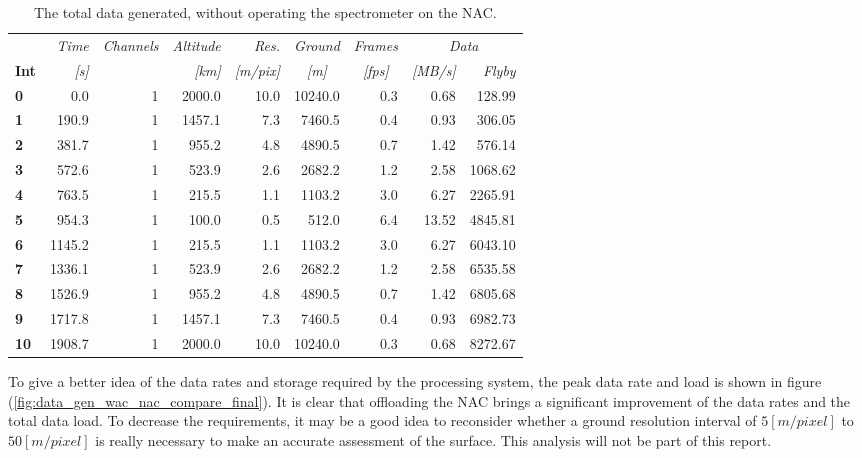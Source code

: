 \begin{table}[htb]
  \centering
    \begin{tabular}{l|r|r|r|r|r|r|r|r}
      & \textit{Time} & \textit{Channels} & \textit{Altitude} & \textit{Res.} & \textit{Ground} & \textit{Frames } & \multicolumn{2}{c}{\textit{Data}} \\
\textbf{Int} & \textit{[s]} & \textit{} & \textit{[km]} & \textit{[m/pix]} & \multicolumn{1}{c|}{\textit{[m]}} & \multicolumn{1}{c|}{\textit{[fps]}} & \textit{[MB/s]} & \textit{Flyby} \bigstrut[b]\\
\hline
\textbf{0} & 0.0   & 1     & 2000.0 & 10.0  & 10240.0 & 0.3   & 0.68  & 128.99 \bigstrut[t]\\
\textbf{1} & 190.9 & 1     & 1457.1 & 7.3   & 7460.5 & 0.4   & 0.93  & 306.05 \\
\textbf{2} & 381.7 & 1     & 955.2 & 4.8   & 4890.5 & 0.7   & 1.42  & 576.14 \\
\textbf{3} & 572.6 & 1     & 523.9 & 2.6   & 2682.2 & 1.2   & 2.58  & 1068.62 \\
\textbf{4} & 763.5 & 1     & 215.5 & 1.1   & 1103.2 & 3.0   & 6.27  & 2265.91 \\
\textbf{5} & 954.3 & 1     & 100.0 & 0.5   & 512.0 & 6.4   & 13.52 & 4845.81 \\
\textbf{6} & 1145.2 & 1     & 215.5 & 1.1   & 1103.2 & 3.0   & 6.27  & 6043.10 \\
\textbf{7} & 1336.1 & 1     & 523.9 & 2.6   & 2682.2 & 1.2   & 2.58  & 6535.58 \\
\textbf{8} & 1526.9 & 1     & 955.2 & 4.8   & 4890.5 & 0.7   & 1.42  & 6805.68 \\
\textbf{9} & 1717.8 & 1     & 1457.1 & 7.3   & 7460.5 & 0.4   & 0.93  & 6982.73 \\
\textbf{10} & 1908.7 & 1     & 2000.0 & 10.0  & 10240.0 & 0.3   & 0.68  & 8272.67 \\
\end{tabular}%
    \caption{The total data generated, without operating the spectrometer on the NAC.}
  \label{tab:nac_flyby_data_spectrometer_final}%
\end{table}%
To give a better idea of the data rates and storage required by the processing system, the peak data rate and load is shown in figure (\ref{fig:data_gen_wac_nac_compare_final}). It is clear that offloading the NAC brings a significant improvement of the data rates and the total data load. To decrease the requirements, it may be a good idea to reconsider whether a ground resolution interval of $5[m/pixel]$ to $50[m/pixel]$ is really necessary to make an accurate assessment of the surface. This analysis will not be part of this report.
